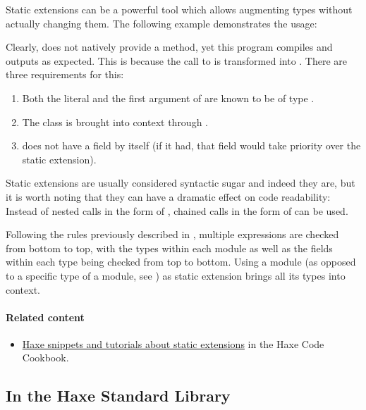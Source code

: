 Static extensions can be a powerful tool which allows augmenting types without actually changing them. The following example demonstrates the usage:


Clearly,  does not natively provide a  method, yet this program compiles and outputs  as expected. This is because the call to  is transformed into . There are three requirements for this:

\begin{enumerate}
	\item Both the literal  and the first argument of  are known to be of type .
	\item The class  is brought into context through .
	\item {} does not have a  field by itself (if it had, that field would take priority over the static extension).
\end{enumerate}

Static extensions are usually considered syntactic sugar and indeed they are, but it is worth noting that they can have a dramatic effect on code readability: Instead of nested calls in the form of , chained calls in the form of  can be used.

Following the rules previously described in , multiple  expressions are checked from bottom to top, with the types within each module as well as the fields within each type being checked from top to bottom. Using a module (as opposed to a specific type of a module, see ) as static extension brings all its types into context.


\paragraph{Related content}
\begin{itemize}
	\item \href{http://code.haxe.org/tag/static-extension.html}{Haxe snippets and tutorials about static extensions} in the Haxe Code Cookbook.
\end{itemize} 


\subsection{In the Haxe Standard Library}
\label{lf-static-extension-in-std}

